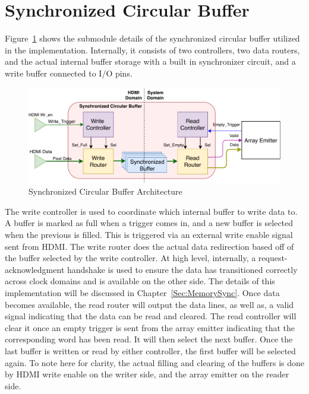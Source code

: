 \section{Synchronized Circular Buffer}

    Figure~\ref{fig:scb_arch} shows the submodule details of the synchronized circular buffer utilized in the implementation. Internally, it consists of two controllers, two data routers, and the actual internal buffer storage with a built in synchronizer circuit, and a write buffer connected to I/O pins.

    \begin{figure}
        \centering
        \includegraphics[width=1.0\textwidth]{fig/pdp_scb_arch.pdf}
        \caption{Synchronized Circular Buffer Architecture}
        \label{fig:scb_arch}
    \end{figure}

    The write controller is used to coordinate which internal buffer to write data to. A buffer is marked as full when a trigger comes in, and a new buffer is selected when the previous is filled. This is triggered via an external write enable signal sent from HDMI. The write router does the actual data redirection based off of the buffer selected by the write controller. At high level, internally, a request-acknowledgment handshake is used to ensure the data has transitioned correctly across clock domains and is available on the other side. The details of this implementation will be discussed in Chapter~\ref{Sec:MemorySync}. Once data becomes available, the read router will output the data lines, as well as, a valid signal indicating that the data can be read and cleared. The read controller will clear it once an empty trigger is sent from the array emitter indicating that the corresponding word has been read. It will then select the next buffer. Once the last buffer is written or read by either controller, the first buffer will be selected again. To note here for clarity, the actual filling and clearing of the buffers is done by HDMI write enable on the writer side, and the array emitter on the reader side.

